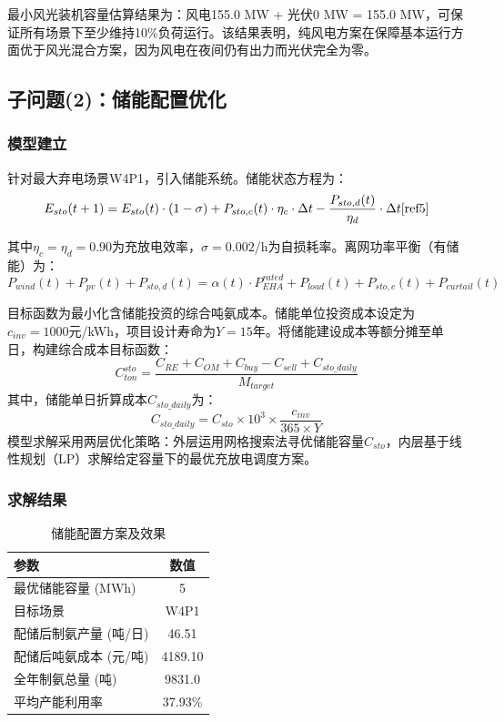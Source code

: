 最小风光装机容量估算结果为：风电155.0 MW + 光伏0 MW = 155.0 MW，可保证所有场景下至少维持10\%负荷运行。该结果表明，纯风电方案在保障基本运行方面优于风光混合方案，因为风电在夜间仍有出力而光伏完全为零。

\subsection{子问题(2)：储能配置优化}

\subsubsection{模型建立}

针对最大弃电场景W4P1，引入储能系统。储能状态方程为：
\begin{equation}
E_{sto}(t+1) = E_{sto}(t) \cdot (1 - \sigma) + P_{sto,c}(t) \cdot \eta_c \cdot \Delta t - \frac{P_{sto,d}(t)}{\eta_d} \cdot \Delta t   \cite{ref5}
\end{equation}

其中$\eta_c = \eta_d = 0.90$为充放电效率，$\sigma = 0.002$/h为自损耗率。离网功率平衡（有储能）为：
\begin{equation}
P_{wind}(t) + P_{pv}(t) + P_{sto,d}(t) = \alpha(t) \cdot P_{EHA}^{rated} + P_{load}(t) + P_{sto,c}(t) + P_{curtail}(t)
\end{equation}

目标函数为最小化含储能投资的综合吨氨成本。储能单位投资成本设定为$c_{inv} = 1000$元/kWh，项目设计寿命为$Y = 15$年。将储能建设成本等额分摊至单日，构建综合成本目标函数：$$C_{ton}^{sto} = \frac{C_{RE} + C_{OM} + C_{buy} - C_{sell} + C_{sto\_daily}}{M_{target}}$$其中，储能单日折算成本$C_{sto\_daily}$为：
$$C_{sto\_daily} = C_{sto} \times 10^3 \times \frac{c_{inv}}{365 \times Y}$$
模型求解采用两层优化策略：外层运用网格搜索法寻优储能容量$C_{sto}$，内层基于线性规划（LP）求解给定容量下的最优充放电调度方案。


\subsubsection{求解结果}

\begin{table}[H]
\centering
\caption{储能配置方案及效果}\label{tab:q4_storage}
\begin{tabular}{lc}
\toprule
参数 & 数值 \\
\midrule
最优储能容量 (MWh) & 5 \\
目标场景 & W4P1 \\
配储后制氨产量 (吨/日) & 46.51 \\
配储后吨氨成本 (元/吨) & 4189.10 \\
全年制氨总量 (吨) & 9831.0 \\
平均产能利用率 & 37.93\% \\
\bottomrule
\end{tabular}
\end{table}

